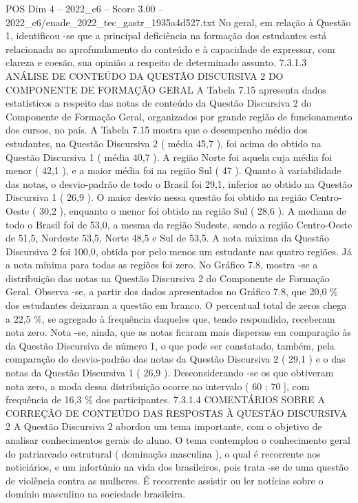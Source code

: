 \begin{textsample}{POS Dim 4 – 2022\_c6 – Score 3.00 – 2022\_c6/enade\_2022\_tec\_gastr\_1935a4d527.txt}
No geral, em relação à Questão 1, identificou -se que a principal deficiência na formação dos estudantes está relacionada ao aprofundamento do conteúdo e à capacidade de expressar, com clareza e coesão, sua opinião a respeito de determinado assunto. 7.3.1.3 ANÁLISE DE CONTEÚDO DA QUESTÃO DISCURSIVA 2 DO COMPONENTE DE FORMAÇÃO GERAL A Tabela 7.15 apresenta dados estatísticos a respeito das notas de conteúdo da Questão Discursiva 2 do Componente de Formação Geral, organizados por grande região de funcionamento dos cursos, no país.
A Tabela 7.15 mostra que o desempenho médio dos estudantes, na Questão Discursiva 2 ( média 45,7 ), foi acima do obtido na Questão Discursiva 1 ( média 40,7 ).
A região Norte foi aquela cuja média foi menor ( 42,1 ), e a maior média foi na região Sul ( 47 ).
Quanto à variabilidade das notas, o desvio-padrão de todo o Brasil foi 29,1, inferior ao obtido na Questão Discursiva 1 ( 26,9 ).
O maior desvio nessa questão foi obtido na região Centro-Oeste ( 30,2 ), enquanto o menor foi obtido na região Sul ( 28,6 ).
A mediana de todo o Brasil foi de 53,0, a mesma da região Sudeste, sendo a região Centro-Oeste de 51,5, Nordeste 53,5, Norte 48,5 e Sul de 53,5.
A nota máxima da Questão Discursiva 2 foi 100,0, obtida por pelo menos um estudante nas quatro regiões.
Já a nota mínima para todas as regiões foi zero.
No Gráfico 7.8, mostra -se a distribuição das notas na Questão Discursiva 2 do Componente de Formação Geral.
Observa -se, a partir dos dados apresentados no Gráfico 7.8, que 20,0 \% dos estudantes deixaram a questão em branco.
O percentual total de zeros chega a 22,5 \%, se agregado à frequência daqueles que, tendo respondido, receberam nota zero.
Nota -se, ainda, que as notas ficaram mais dispersas em comparação às da Questão Discursiva de número 1, o que pode ser constatado, também, pela comparação do desvio-padrão das notas da Questão Discursiva 2 ( 29,1 ) e o das notas da Questão Discursiva 1 ( 26,9 ).
Desconsiderando -se os que obtiveram nota zero, a moda dessa distribuição ocorre no intervalo ( 60 ; 70 ], com frequência de 16,3 \% dos participantes. 7.3.1.4 COMENTÁRIOS SOBRE A CORREÇÃO DE CONTEÚDO DAS RESPOSTAS À QUESTÃO DISCURSIVA 2 A Questão Discursiva 2 abordou um tema importante, com o objetivo de analisar conhecimentos gerais do aluno.
O tema contemplou o conhecimento geral do patriarcado estrutural ( dominação masculina ), o qual é recorrente nos noticiários, e um infortúnio na vida dos brasileiros, pois trata -se de uma questão de violência contra as mulheres.
É recorrente assistir ou ler notícias sobre o domínio masculino na sociedade brasileira.

\end{textsample}
